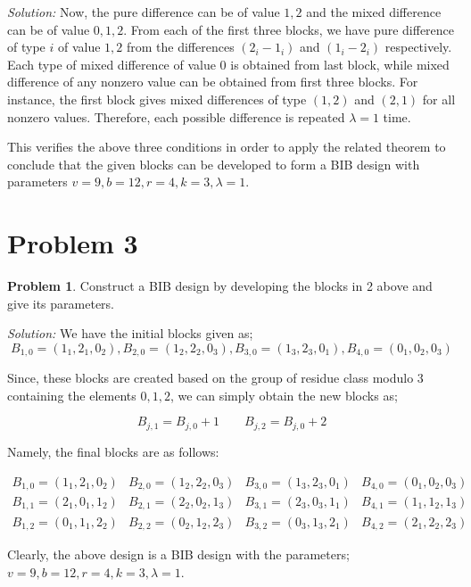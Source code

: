 \documentclass[12pt]{article}
\theoremstyle{definition}
\newtheorem*{prb}{Problem}
\newenvironment{problem}{
\begin{tcolorbox}[colback=blue!5!white,colframe=blue!75!black, parbox = true] \begin{prb}  }{\end{prb}\end{tcolorbox} }
\newenvironment{answer}{\textit{Solution: }\quad }{ \hfill \qedsymbol}
\begin{document}
\begin{answer}
	Now, the pure difference can be of value $1, 2$ and the mixed difference can be of value $0, 1, 2$. From each of the first three blocks, we have pure difference of type $i$ of value $1, 2$ from the differences $(2_i - 1_i)$ and $(1_i - 2_i)$ respectively. Each type of mixed difference of value $0$ is obtained from last block, while mixed difference of any nonzero value can be obtained from first three blocks. For instance, the first block gives mixed differences of type $(1, 2)$ and $(2, 1)$ for all nonzero values. Therefore, each possible difference is repeated $\lambda = 1$ time.

	This verifies the above three conditions in order to apply the related theorem to conclude that the given blocks can be developed to form a BIB design with parameters $v = 9, b = 12, r = 4, k = 3, \lambda = 1$.
\end{answer}


\section{Problem 3}

\begin{problem}
	Construct a BIB design by developing the blocks in 2 above and give its parameters.
\end{problem}

\begin{answer}
	We have the initial blocks given as;
	$$B_{1,0} = (1_1, 2_1, 0_2), B_{2, 0} = (1_2, 2_2, 0_3), B_{3,0} = (1_3, 2_3, 0_1), B_{4, 0} = (0_1, 0_2, 0_3)$$

	Since, these blocks are created based on the group of residue class modulo $3$ containing the elements $0, 1, 2$, we can simply obtain the new blocks as;

	$$B_{j,1} = B_{j, 0} + 1 \qquad B_{j,2} = B_{j, 0} + 2 $$
	
	Namely, the final blocks are as follows:

	$$\begin{array}{llll}
		B_{1,0} = (1_1, 2_1, 0_2) 
		& B_{2, 0} = (1_2, 2_2, 0_3)
		& B_{3,0} = (1_3, 2_3, 0_1)
		& B_{4, 0} = (0_1, 0_2, 0_3)\\
		B_{1,1} = (2_1, 0_1, 1_2) 
		& B_{2, 1} = (2_2, 0_2, 1_3)
		& B_{3,1} = (2_3, 0_3, 1_1)
		& B_{4, 1} = (1_1, 1_2, 1_3)\\
		B_{1,2} = (0_1, 1_1, 2_2) 
		& B_{2, 2} = (0_2, 1_2, 2_3)
		& B_{3,2} = (0_3, 1_3, 2_1)
		& B_{4, 2} = (2_1, 2_2, 2_3)
	\end{array}$$

	Clearly, the above design is a BIB design with the parameters; $v = 9, b = 12, r = 4, k = 3, \lambda = 1$.

\end{answer}
\end{document}

